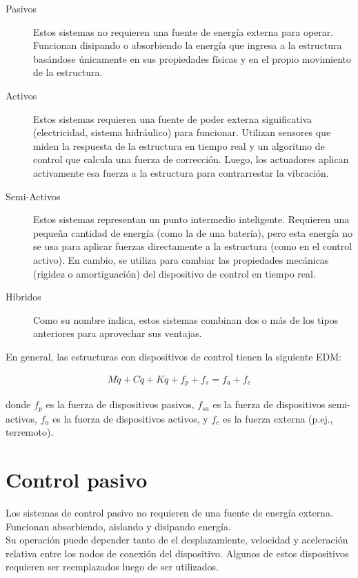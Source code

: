 \begin{description} 
    \item[Pasivos] Estos sistemas no requieren una fuente de energía externa para operar. Funcionan disipando o absorbiendo la energía que ingresa a la estructura basándose únicamente en sus propiedades físicas y en el propio movimiento de la estructura.
    \item[Activos] Estos sistemas requieren una fuente de poder externa significativa (electricidad, sistema hidráulico) para funcionar. Utilizan sensores que miden la respuesta de la estructura en tiempo real y un algoritmo de control que calcula una fuerza de corrección. Luego, los actuadores aplican activamente esa fuerza a la estructura para contrarrestar la vibración.
    \item[Semi-Activos] Estos sistemas representan un punto intermedio inteligente. Requieren una pequeña cantidad de energía (como la de una batería), pero esta energía no se usa para aplicar fuerzas directamente a la estructura (como en el control activo). En cambio, se utiliza para cambiar las propiedades mecánicas (rigidez o amortiguación) del dispositivo de control en tiempo real.
    \item[Híbridos] Como su nombre indica, estos sistemas combinan dos o más de los tipos anteriores para aprovechar sus ventajas.
\end{description}


En general, las estructuras con dispositivos de control tienen la siguiente EDM:

\begin{align*}
    {M}{\ddot{q}} + {C}{\dot{q}} + {K}{q} + {f}_{p} + f_{s} = {f}_a + {f}_e
\end{align*}

\noindent donde ${f}_{p}$ es la fuerza de dispositivos pasivos, ${f}_{sa}$ es la fuerza de dispositivos semi-activos, ${f}_a$ es la fuerza de dispositivos activos, y ${f}_e$ es la fuerza externa (p.ej., terremoto).

\section{Control pasivo}
Los sistemas de control pasivo no requieren de una fuente de energía externa. \\

Funcionan absorbiendo, aislando y disipando energía. \\

Su operación puede depender tanto de el desplazamiente, velocidad y aceleración relativa entre los nodos de conexión del dispositivo. Algunos de estos dispositivos requieren ser reemplazados luego de ser utilizados. \\


